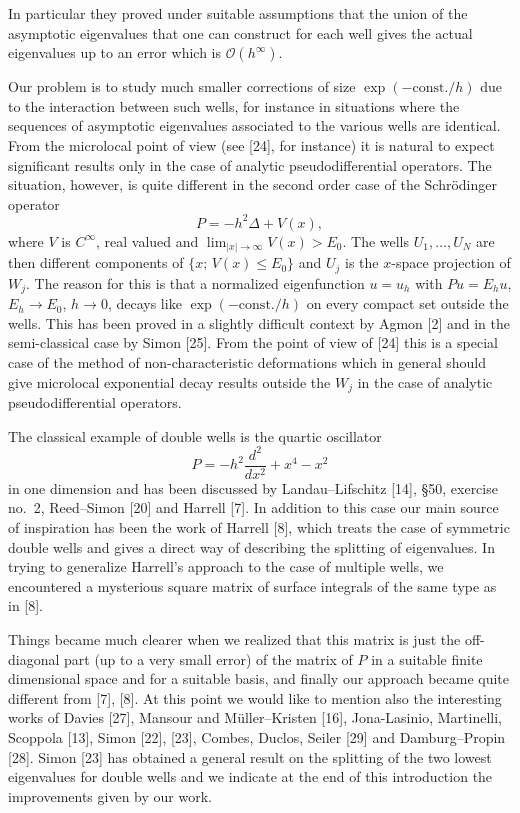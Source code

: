 \documentclass[11pt,a4paper]{article}
\newcommand{\cO}{\mathcal O}
\numberwithin{equation}{section}
\theoremstyle{remark}
\begin{document}
In particular they proved under suitable assumptions that the union of the asymptotic eigenvalues that one can construct for each well gives the actual eigenvalues up to an error which is $\cO(h^\infty)$.

Our problem is to study much smaller corrections of size $\exp(-\mathrm{const.}/h)$ due to the interaction between such wells, for instance in situations where the sequences of asymptotic eigenvalues associated to the various wells are identical. From the microlocal point of view (see [24], for instance) it is natural to expect significant results only in the case of analytic pseudodifferential operators. The situation, however, is quite different in the second order case of the Schr\"odinger operator
\begin{equation}
P=-h^2\Delta+V(x),
\end{equation}
where $V$ is $C^\infty$, real valued and $\lim_{|x|\to\infty}V(x)>E_0$. The wells $U_1,\ldots,U_N$ are then different components of $\{x;\,V(x)\le E_0\}$ and $U_j$ is the $x$-space projection of $W_j$. The reason for this is that a normalized eigenfunction $u=u_h$ with $Pu=E_hu$, $E_h\to E_0$, $h\to0$, decays like $\exp(-\mathrm{const.}/h)$ on every compact set outside the wells. This has been proved in a slightly difficult context by Agmon [2] and in the semi-classical case by Simon [25]. From the point of view of [24] this is a special case of the method of non-characteristic deformations which in general should give microlocal exponential decay results outside the $W_j$ in the case of analytic pseudodifferential operators.

The classical example of double wells is the quartic oscillator
\[
P=-h^2\frac{d^2}{dx^2}+x^4-x^2
\]
in one dimension and has been discussed by Landau--Lifschitz [14], \S50, exercise no.~2, Reed--Simon [20] and Harrell [7]. In addition to this case our main source of inspiration has been the work of Harrell [8], which treats the case of symmetric double wells and gives a direct way of describing the splitting of eigenvalues. In trying to generalize Harrell's approach to the case of multiple wells, we encountered a mysterious square matrix of surface integrals of the same type as in [8].

Things became much clearer when we realized that this matrix is just the off-diagonal part (up to a very small error) of the matrix of $P$ in a suitable finite dimensional space and for a suitable basis, and finally our approach became quite different from [7], [8]. At this point we would like to mention also the interesting works of Davies [27], Mansour and M\"uller--Kristen [16], Jona-Lasinio, Martinelli, Scoppola [13], Simon [22], [23], Combes, Duclos, Seiler [29] and Damburg--Propin [28]. Simon [23] has obtained a general result on the splitting of the two lowest eigenvalues for double wells and we indicate at the end of this introduction the improvements given by our work.
\end{document}
